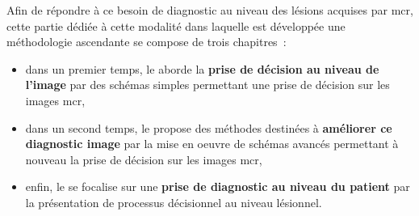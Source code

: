 Afin de répondre à ce besoin de diagnostic au niveau des lésions acquises par \gls{mcr}, cette partie dédiée à cette modalité dans laquelle est développée une méthodologie ascendante se compose de trois chapitres~:
\begin{itemize}
    \item dans un premier temps, le  aborde la \textbf{prise de décision au niveau de l'image} par des schémas simples permettant une prise de décision sur les images \gls{mcr},
    \item dans un second temps, le  propose des méthodes destinées à \textbf{améliorer ce diagnostic image} par la mise en oeuvre de schémas avancés permettant à nouveau la prise de décision sur les images \gls{mcr},
    \item enfin, le  se focalise sur une \textbf{prise de diagnostic au niveau du patient} par la présentation de processus décisionnel au niveau lésionnel.
\end{itemize}\par
\newpage